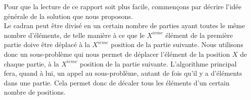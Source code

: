 Pour que la lecture de ce rapport soit plus facile, commençons par décrire l'idée générale de la solution que nous proposons. \\

Le cadran peut être divisé en un certain nombre de parties ayant toutes le même nombre d'éléments, de telle manière à ce que le $X^{ieme}$ élément de la première partie doive être déplacé à la $X^{ieme}$ position de la partie suivante. Nous utilisons donc un sous-problème qui nous permet de déplacer l'élément de la position $X$ de chaque partie, à la $X^{ieme}$ position de la partie suivante. L'algorithme principal fera, quand à lui, un appel au sous-problème, autant de fois qu'il y a d'éléments dans une partie. Cela permet donc de décaler tous les éléments d'un certain nombre de positions. \\